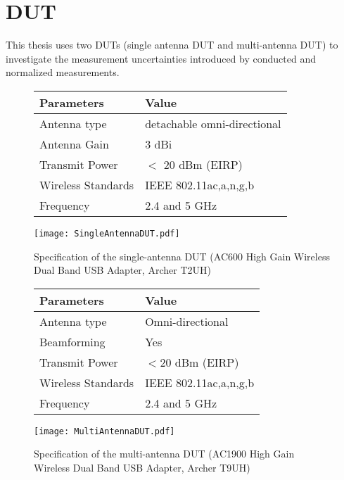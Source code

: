 \section{\ac{DUT}}
This thesis uses two \acsp{DUT} (single antenna \acs{DUT} and multi-antenna \acs{DUT}) to investigate the measurement uncertainties introduced by conducted and normalized measurements. 

\begin{figure}[h]
    \begin{minipage}[c]{.7\textwidth}%
        \begin {tabular} {|l|l|} 
\toprule
Parameters & Value \\ 
\midrule 
Antenna type & detachable omni-directional \\
Antenna Gain & 3 dBi \\
Transmit Power & $<$ 20 dBm (\acs{EIRP})\\ 
Wireless Standards & \acs{IEEE} 802.11ac,a,n,g,b \\
Frequency & 2.4 and 5 GHz \\
\bottomrule
\end {tabular}    \end{minipage}
    \hfill
    \begin{minipage}[c]{.2\textwidth}
        \texttt{[image: SingleAntennaDUT.pdf]}
    \end{minipage}
    \caption{Specification of the single-antenna \acs{DUT} (AC600 High Gain Wireless Dual Band USB Adapter, Archer T2UH) \cite{tplinksingle}}
\label{fig:singleAntennaDUT}
\end{figure}     

\begin{figure}[h]
    \begin{minipage}[c]{.7\textwidth}%
        \begin {tabular} {|l|l|} 
\toprule
Parameters & Value \\ 
\midrule 
Antenna type & Omni-directional \\
Beamforming & Yes \\
Transmit Power &  $<$20 dBm (\acs{EIRP})\\ 
Wireless Standards & \acs{IEEE} 802.11ac,a,n,g,b \\
Frequency & 2.4 and 5 GHz \\
\bottomrule
\end {tabular}    \end{minipage}
    \hfill
    \begin{minipage}[c]{.2\textwidth}
        \texttt{[image: MultiAntennaDUT.pdf]}
    \end{minipage}
    \caption{Specification of the multi-antenna \acs{DUT} (AC1900 High Gain Wireless Dual Band USB Adapter, Archer T9UH)\cite{tplinkmulti}}
\label{fig:multiAntennaDUT}
\end{figure}     
